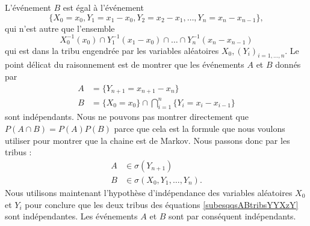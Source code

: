 L'événement \( B\) est égal à l'événement
\begin{equation}
	\{ X_0=x_0,Y_1=x_1-x_0,Y_2=x_2-x_1,\ldots,Y_n=x_n-x_{n-1} \},
\end{equation}
qui n'est autre que l'ensemble
\begin{equation}
	X_0^{-1}(x_0)\cap Y_1^{-1}(x_1-x_0)\cap\ldots\cap Y_{n}^{-1}(x_n-x_{n-1})
\end{equation}
qui est dans la tribu engendrée par les variables aléatoires \( X_0,(Y_i)_{i=1,\ldots,n}\). Le point délicat du raisonnement est de montrer que les événements \( A\) et \( B\) donnés par
\begin{subequations}
	\begin{align}
		A & =\{ Y_{n+1}=x_{n+1}-x_n \}                             \\
		B & =\{ X_0=x_0 \}\cap\bigcap_{i=1}^n \{ Y_i=x_i-x_{i-1}\}
	\end{align}
\end{subequations}
sont indépendants. Nous ne pouvons pas montrer directement que \( P(A\cap B)=P(A)P(B)\) parce que cela est la formule que nous voulons utiliser pour montrer que la chaine est de Markov. Nous passons donc par les tribus :
\begin{subequations}        \label{subesqqsABtribsYYXzY}
	\begin{align}
		A & \in\sigma(Y_{n+1})             \\
		B & \in\sigma(X_0,Y_1,\ldots,Y_n).
	\end{align}
\end{subequations}
Nous utilisons maintenant l'hypothèse d'indépendance des variables aléatoires \( X_0\) et \( Y_i\) pour conclure que les deux tribus des équations \eqref{subesqqsABtribsYYXzY} sont indépendantes. Les événements \( A\) et \( B\) sont par conséquent indépendants.


